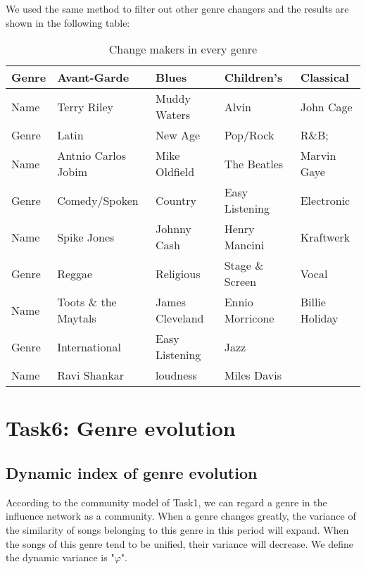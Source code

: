 \documentclass[12pt]{article}  %
\begin{document}
We used the same method to filter out other genre changers and the results are shown in the following table:

\begin{table}[H]
	\centering
	\begin{tabular}{|l|l|l|l|l|}
		\hline
		Genre & Avant-Garde          & Blues           & Children's      & Classical      \\ \hline
		Name  & Terry Riley          & Muddy Waters    & Alvin           & John Cage      \\ \hline
		Genre & Latin                & New Age         & Pop/Rock        & R\&B;          \\ \hline
		Name  & Antnio Carlos Jobim  & Mike Oldfield   & The Beatles     & Marvin Gaye    \\ \hline
		Genre & Comedy/Spoken        & Country         & Easy Listening  & Electronic     \\ \hline
		Name  & Spike Jones          & Johnny Cash     & Henry Mancini   & Kraftwerk      \\ \hline
		Genre & Reggae               & Religious       & Stage \& Screen & Vocal          \\ \hline
		Name  & Toots \& the Maytals & James Cleveland & Ennio Morricone & Billie Holiday \\ \hline
		Genre & International        & Easy Listening  & Jazz            &                \\ \hline
		Name  & Ravi Shankar         & loudness        & Miles Davis     &                \\ \hline
	\end{tabular}
	\caption{Change makers in every genre}
	\label{tab:my-table}
\end{table}

\section{Task6: Genre evolution}
\subsection{Dynamic index of genre evolution}
According to the community model of Task1, we can regard a genre in the influence network as a community. When a genre changes greatly, the variance of the similarity of songs belonging to this genre in this period will expand. When the songs of this genre tend to be unified, their variance will decrease. We define the dynamic variance is "$\varphi $".
\end{document}
